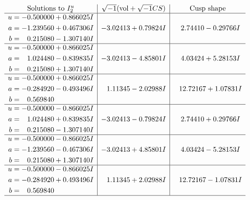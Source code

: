 \documentclass[1p]{elsarticle_modified}
\theoremstyle{definition}
\newcommand{\I}{\sqrt{-1}}
\begin{document}
$$\begin{array}{c|c|c}  
\text{Solutions to }I^u_{2}& \I (\text{vol} + \sqrt{-1}CS) & \text{Cusp shape}\\
 \hline 
\begin{aligned}
u &= -0.500000 + 0.866025 I \\
a &= -1.239560 + 0.467306 I \\
b &= \phantom{-}0.215080 - 1.307140 I\end{aligned}
 & -3.02413 + 0.79824 I & \phantom{-}2.74410 - 0.29766 I \\ \hline\begin{aligned}
u &= -0.500000 + 0.866025 I \\
a &= \phantom{-}1.024480 - 0.839835 I \\
b &= \phantom{-}0.215080 + 1.307140 I\end{aligned}
 & -3.02413 - 4.85801 I & \phantom{-}4.03424 + 5.28153 I \\ \hline\begin{aligned}
u &= -0.500000 + 0.866025 I \\
a &= -0.284920 - 0.493496 I \\
b &= \phantom{-}0.569840\phantom{ +0.000000I}\end{aligned}
 & \phantom{-}1.11345 - 2.02988 I & \phantom{-}12.72167 + 1.07831 I \\ \hline\begin{aligned}
u &= -0.500000 - 0.866025 I \\
a &= \phantom{-}1.024480 + 0.839835 I \\
b &= \phantom{-}0.215080 - 1.307140 I\end{aligned}
 & -3.02413 - 0.79824 I & \phantom{-}2.74410 + 0.29766 I \\ \hline\begin{aligned}
u &= -0.500000 - 0.866025 I \\
a &= -1.239560 - 0.467306 I \\
b &= \phantom{-}0.215080 + 1.307140 I\end{aligned}
 & -3.02413 + 4.85801 I & \phantom{-}4.03424 - 5.28153 I \\ \hline\begin{aligned}
u &= -0.500000 - 0.866025 I \\
a &= -0.284920 + 0.493496 I \\
b &= \phantom{-}0.569840\phantom{ +0.000000I}\end{aligned}
 & \phantom{-}1.11345 + 2.02988 I & \phantom{-}12.72167 - 1.07831 I\\
 \hline 
 \end{array}$$\newpage
\end{document}
